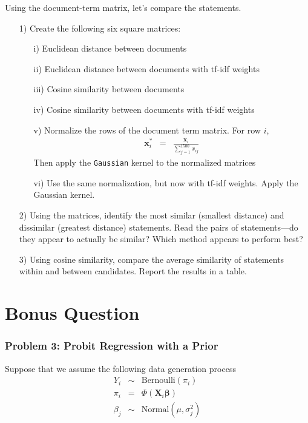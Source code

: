 \documentclass[12pt,letterpaper]{article}
\begin{document}
Using the document-term matrix, let's compare the statements.
\begin{itemize}
\item[1)] Create the following six square matrices:
\begin{itemize}
\item[i)] Euclidean distance between documents
\item[ii)] Euclidean distance between documents with tf-idf weights
\item[iii)] Cosine similarity between documents
\item[iv)] Cosine similarity between documents with tf-idf weights
\item[v)] Normalize the rows of the document term matrix.  For row $i$, 
\begin{eqnarray}
\boldsymbol{x}_{i}^{*} & = & \frac{\boldsymbol{x}_{i}}{\sum_{j=1}^{1500} x_{ij}} \nonumber 
\end{eqnarray}
Then apply the {\tt Gaussian} kernel to the normalized matrices
\item[vi)] Use the same normalization, but now with tf-idf weights.  Apply the Gaussian kernel.   
\end{itemize}
\item[2)] Using the matrices, identify the most similar (smallest distance) and dissimilar (greatest distance) statements.  Read the pairs of statements---do they appear to actually be similar?  Which method appears to perform best?
\item[3)] Using cosine similarity, compare the average similarity of statements within and between candidates.  Report the results in a table.  
\end{itemize}









\section*{Bonus Question}


\subsubsection*{Problem 3: Probit Regression with a Prior}

Suppose that we assume the following data generation process
\begin{eqnarray}
Y_{i} & \sim & \text{Bernoulli}(\pi_{i} ) \nonumber \\
\pi_{i} & = & \Phi(\boldsymbol{X}_{i} \boldsymbol{\beta}) \nonumber \\
\beta_{j} & \sim & \text{Normal}(\mu, \sigma^{2}_{j} )\nonumber 
\end{eqnarray}
\end{document}
